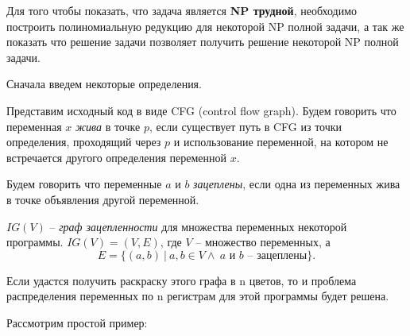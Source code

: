 Для того чтобы показать, что задача является \textbf{NP трудной}, необходимо построить полиномиальную редукцию
для некоторой NP полной задачи, а так же показать что решение задачи позволяет получить решение некоторой
NP полной задачи.

Сначала введем некоторые определения.


\begin{definition}

    \label{def:liveness} %

    Представим исходный код в виде CFG (control flow graph).
    Будем говорить что переменная $x$ \textit{жива} в точке $p$, если существует путь в CFG из точки определения, проходящий
    через $p$ и использование переменной, на котором не встречается другого определения переменной $x$.

\end{definition}

\begin{definition}

    Будем говорить что переменные $a$ и $b$ \textit{зацеплены}, если одна из переменных жива в точке объявления
    другой переменной.

\end{definition}

\begin{definition}

    $IG(V)$ -- \textit{граф зацепленности} для множества переменных некоторой программы.
    $IG(V) = (V, E)$, где $V$ -- множество переменных, а
    $$E = \{(a, b) \ | \  a, b \in V \land \ a \text{ и } b \text{ -- зацеплены}\}.$$

\end{definition}

Если удастся получить раскраску этого графа в n цветов, то и проблема распределения переменных по
n регистрам для этой программы будет решена.

Рассмотрим простой пример:

